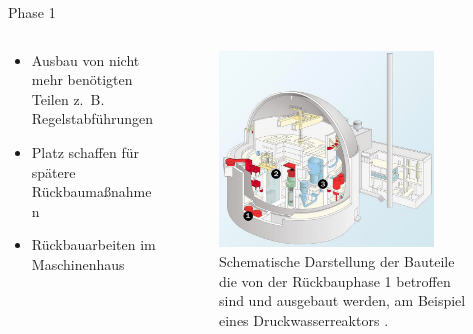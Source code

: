 \begin{frame}{Phase 1}
  \begin{columns}

    \begin{column}{0.48\textwidth}
      \begin{itemize}
        \setlength\itemsep{1.2em}
        \item{ Ausbau von nicht mehr benötigten Teilen z.\, B. Regelstabführungen }
        \item{ Platz schaffen für spätere Rückbaumaßnahmen}
        \item{ Rückbauarbeiten im Maschinenhaus}
      \end{itemize}
    \end{column}

    \begin{column}{0.48\textwidth}
      \begin{figure}
         \centering
         \includegraphics[width=0.85\textwidth]{./bilder/abbau_phase_1_spiegel.png}
         \caption{Schematische Darstellung der Bauteile die von der Rückbauphase 1 betroffen sind und ausgebaut werden, am Beispiel eines Druckwasserreaktors \cite{abbau_grafik_stade}. }
         \label{ fig: phase_1 }
       \end{figure}
    \end{column}

  \end{columns}
\end{frame}



